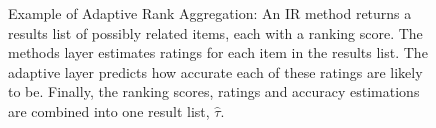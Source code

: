 \begin{figure}[t]
  \vspace{1em}
  \caption[Example of Adaptive Rank Aggregation]{
    Example of Adaptive Rank Aggregation: 
    An IR method returns a results list of possibly related items, each with a ranking score.
    The methods layer estimates ratings for each item in the results list.
    The adaptive layer predicts how accurate each of these ratings are likely to be.
    Finally, the ranking scores, ratings and accuracy estimations are combined
    into one result list, $\hat{\tau}$.
  }
  \label{fig:adaptiverank}
\end{figure}
